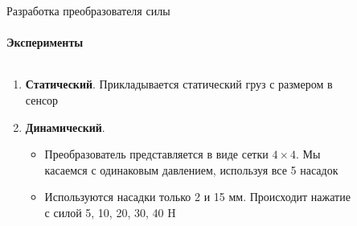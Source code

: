 \documentclass[aspectratio=169,xcolor=table]{beamer}
\begin{document}
\begin{frame}[t]{Разработка преобразователя силы}
    \framesubtitle{Эксперименты}
    \vspace{-15pt}
    \begin{columns}[T,onlytextwidth]
        \begin{column}{0.6\textwidth}
            {\large
                \begin{enumerate}
                    \item \textbf{Статический}. Прикладывается статический груз с размером в сенсор
                          \item\textbf{Динамический}.
                          \begin{itemize}
                            \large
                              \item Преобразователь представляется в виде сетки $4\times4$. Мы касаемся с одинаковым давлением, используя все 5 насадок
                              \item Используются насадки только 2 и 15 мм. Происходит нажатие с силой 5, 10, 20, 30, 40 H
                          \end{itemize}
                \end{enumerate}
            }
        \end{column}
        \begin{column}{0.39\textwidth}
            \vspace{-0.5cm}
            \begin{figure}[H]
                \centering
\end{figure}
\end{column}
\end{columns}
\end{frame}
\end{document}
